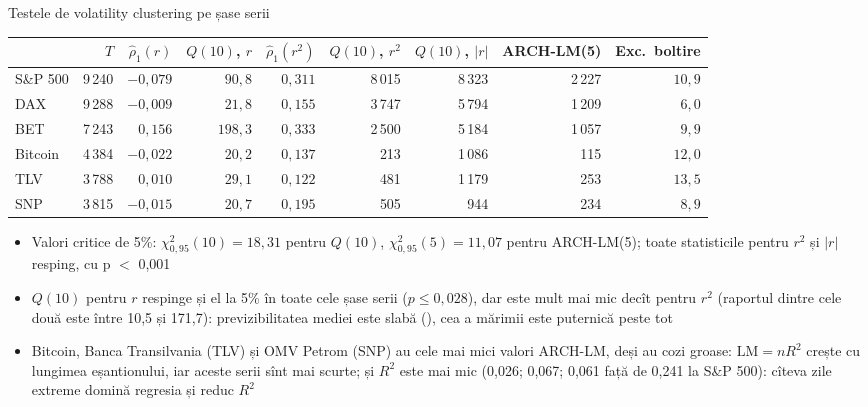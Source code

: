 \begin{frame}{Testele de volatility clustering pe șase serii}
\itemsize{\footnotesize}
\begin{center}
\scriptsize
\begin{tabular}{lrrrrrrrr}
\toprule
& $T$ & $\hat\rho_1(r)$ & $Q(10)$, $r$ & $\hat\rho_1(r^2)$ & $Q(10)$, $r^2$ & $Q(10)$, $|r|$ & ARCH-LM(5) & \textbf{Exc.\ boltire} \\
\midrule
S\&P 500 & 9\,240 & ${-0{,}079}$ & $90{,}8$ & $0{,}311$ & 8\,015 & 8\,323 & 2\,227 & $10{,}9$ \\
DAX & 9\,288 & ${-0{,}009}$ & $21{,}8$ & $0{,}155$ & 3\,747 & 5\,794 & 1\,209 & $6{,}0$ \\
BET & 7\,243 & ${0{,}156}$ & $198{,}3$ & $0{,}333$ & 2\,500 & 5\,184 & 1\,057 & $9{,}9$ \\
Bitcoin & 4\,384 & ${-0{,}022}$ & $20{,}2$ & $0{,}137$ & 213 & 1\,086 & 115 & $12{,}0$ \\
TLV & 3\,788 & ${0{,}010}$ & $29{,}1$ & $0{,}122$ & 481 & 1\,179 & 253 & $13{,}5$ \\
SNP & 3\,815 & ${-0{,}015}$ & $20{,}7$ & $0{,}195$ & 505 & 944 & 234 & $8{,}9$ \\
\bottomrule
\end{tabular}
\end{center}
\begin{itemize}
    \item Valori critice de 5\%: $\chi^2_{0{,}95}(10) = 18{,}31$ pentru $Q(10)$, $\chi^2_{0{,}95}(5) = 11{,}07$ pentru ARCH-LM(5); toate statisticile pentru $r^2$ și $|r|$ resping, cu p $<$ 0,001
    \item $Q(10)$ pentru $r$ respinge și el la 5\% în toate cele șase serii ($p \le 0{,}028$), dar este mult mai mic decît pentru $r^2$ (raportul dintre cele două este între 10{,}5 și 171{,}7): previzibilitatea mediei este slabă (), cea a mărimii este puternică peste tot
    \item Bitcoin, Banca Transilvania (TLV) și OMV Petrom (SNP) au cele mai mici valori ARCH-LM, deși au cozi groase: $\mathrm{LM} = nR^2$ crește cu lungimea eșantionului, iar aceste serii sînt mai scurte; și $R^2$ este mai mic (0{,}026; 0{,}067; 0{,}061 față de 0{,}241 la S\&P 500): cîteva zile extreme domină regresia și reduc $R^2$
\end{itemize}
\end{frame}

